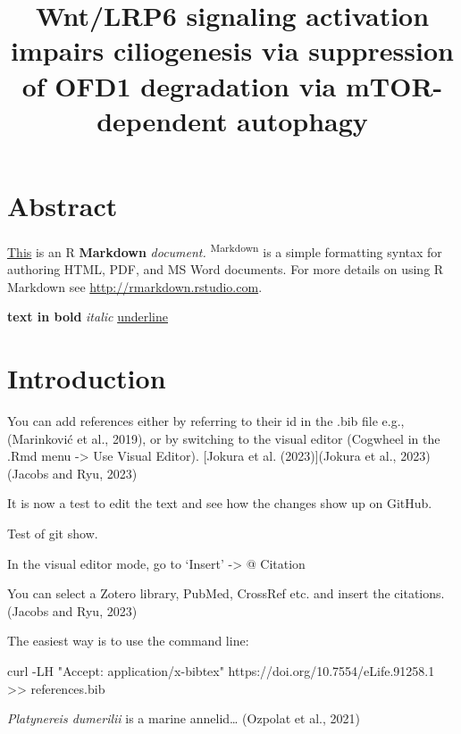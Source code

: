 \documentclass[
  11pt,
]{article}
\title{Wnt/LRP6 signaling activation impairs ciliogenesis via
suppression of OFD1 degradation via mTOR-dependent autophagy}
\subtitle{\raggedright

Cheng Yuan 1\textsuperscript{1,2} ,Bahtiyar Kurtulmus
2\textsuperscript{1,2}, Sergio Acebron 3\textsuperscript{3}, Gislene
Pereira 4\textsuperscript{4,*} \newline\textsuperscript{1}Heidelberg
University, Centre for Organismal Studies (COS), 69120 Heidelberg,
Germany \newline\textsuperscript{2}Affiliation 2
\newline\textsuperscript{3}Affiliation 3
\newline\textsuperscript{4}Affiliation 4\newline
\textsuperscript{*}Correspondence: xy@cos.uni-heidelberg.de}
\author{}
\date{}
\newenvironment{Shaded}{\begin{snugshade}}{\end{snugshade}}
\newcommand{\AttributeTok}[1]{\textcolor[rgb]{0.40,0.45,0.13}{#1}}
\newcommand{\ExtensionTok}[1]{\textcolor[rgb]{0.00,0.23,0.31}{#1}}
\newcommand{\NormalTok}[1]{\textcolor[rgb]{0.00,0.23,0.31}{#1}}
\newcommand{\OperatorTok}[1]{\textcolor[rgb]{0.37,0.37,0.37}{#1}}
\newcommand{\StringTok}[1]{\textcolor[rgb]{0.13,0.47,0.30}{#1}}
\renewcommand*\contentsname{Table of contents}
\newcommand\contentsname{Table of contents}
\begin{document}
\maketitle

\linenumbers

\renewcommand*\contentsname{Table of contents}
{
\hypersetup{linkcolor=}
\setcounter{tocdepth}{3}
\tableofcontents
}
\section{Abstract}\label{abstract}

\ul{This} is an R \textbf{Markdown} \emph{document.}
\textsuperscript{Markdown} is a simple formatting syntax for authoring
HTML, PDF, and MS Word documents. For more details on using R Markdown
see \url{http://rmarkdown.rstudio.com}.

\textbf{text in bold} \emph{italic} \ul{underline}

\section{Introduction}\label{introduction}

You can add references either by referring to their id in the .bib file
e.g., (Marinković et al., 2019), or by switching to the visual editor
(Cogwheel in the .Rmd menu -\textgreater{} Use Visual Editor). {[}Jokura
et al. (2023){]}(Jokura et al., 2023)(Jacobs and Ryu, 2023)

It is now a test to edit the text and see how the changes show up on
GitHub.

Test of git show.

In the visual editor mode, go to `Insert' -\textgreater{} @ Citation

You can select a Zotero library, PubMed, CrossRef etc. and insert the
citations. (Jacobs and Ryu, 2023)

The easiest way is to use the command line:

\begin{Shaded}
\begin{Highlighting}[]
\ExtensionTok{curl} \AttributeTok{{-}LH} \StringTok{"Accept: application/x{-}bibtex"}\NormalTok{ https://doi.org/10.7554/eLife.91258.1 }\OperatorTok{\textgreater{}\textgreater{}}\NormalTok{ references.bib}
\end{Highlighting}
\end{Shaded}

\emph{Platynereis dumerilii} is a marine annelid\ldots{} (Ozpolat et
al., 2021)
\end{document}
